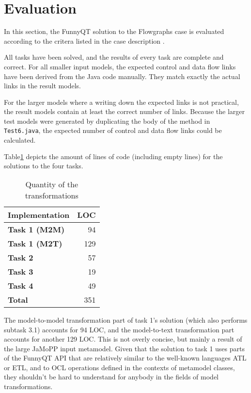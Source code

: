 \documentclass[11pt]{article}
\begin{document}
\section{Evaluation}
\label{sec:evaluation}


In this section, the FunnyQT solution to the Flowgraphs case is evaluated
according to the critera listed in the case description
\cite{flowgraphcasedesc}.

All tasks have been solved, and the results of every task are complete and
correct.  For all smaller input models, the expected control and data flow
links have been derived from the Java code manually.  They match exactly the
actual links in the result models.

For the larger models where a writing down the expected links is not practical,
the result models contain at least the correct number of links.  Because the
larger test models were generated by duplicating the body of the method in
\verb|Test6.java|, the expected number of control and data flow links could be
calculated.

Table\ref{tab:eval-quantity} depicts the amount of lines of code (including
empty lines) for the solutions to the four tasks.

\begin{table}[h!]
  \centering
  \begin{tabular}{| l | r |}
    \hline
    \textbf{Implementation} & \textbf{LOC}\\
    \hline
    \textbf{Task 1 (M2M)} & 94\\
    \textbf{Task 1 (M2T)} & 129\\
    \textbf{Task 2} & 57\\
    \textbf{Task 3} & 19\\
    \textbf{Task 4} & 49\\
    \hline
    \textbf{Total} & 351\\
    \hline
  \end{tabular}
  \caption{Quantity of the transformations}
  \label{tab:eval-quantity}
\end{table}

The model-to-model transformation part of task 1's solution (which also
performs subtask 3.1) accounts for 94 LOC, and the model-to-text transformation
part accounts for another 129 LOC.  This is not overly concise, but mainly a
result of the large JaMoPP input metamodel.  Given that the solution to task 1
uses parts of the FunnyQT API that are relatively similar to the well-known
languages ATL or ETL, and to OCL operations defined in the contexts of
metamodel classes, they shouldn't be hard to understand for anybody in the
fields of model transformations.
\end{document}

